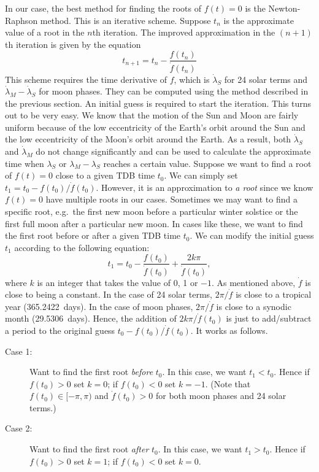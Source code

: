 \documentclass[12pt]{article}
\newcommand \beq {\begin{equation}}
\newcommand \eeq {\end{equation}}
\begin{document}
\begin{CJK}{UTF8}{bkai}
In our case, the best method for finding the roots of $f(t)=0$ is the Newton-Raphson 
method. This is an iterative scheme. Suppose $t_n$ is the approximate value of 
a root in the $n$th iteration. The improved approximation in the $(n+1)$th iteration 
is given by the equation 
\beq
  t_{n+1} = t_n - \frac{f(t_n)}{\dot{f}(t_n)} 
\eeq
This scheme requires the time derivative of $f$, which is $\dot{\lambda}_S$ for 
24 solar terms and $\dot{\lambda}_M - \dot{\lambda}_S$ for moon phases. They can be 
computed using the method described in the previous section. An initial guess is 
required to start the iteration. 
This turns out to be very easy. We know that the motion of the Sun and 
Moon are fairly uniform because of the low eccentricity of the Earth's orbit around 
the Sun and the low eccentricity of the Moon's orbit around the Earth. As a result, 
both $\dot{\lambda}_S$ and $\dot{\lambda}_M$ do not change significantly and can be 
used to calculate the approximate time when $\lambda_S$ or $\lambda_M-\lambda_S$ 
reaches a certain value. Suppose we want to find a root of $f(t)=0$ close to 
a given TDB time $t_0$. We can simply set $t_1 = t_0 - f(t_0)/\dot{f}(t_0)$. 
However, it is an approximation to 
{\em a root} since we know $f(t)=0$ have multiple roots in our cases. Sometimes 
we may want to find a specific root, e.g.\ the first new moon before a particular 
winter solstice or the first full moon after a particular new moon. In cases like 
these, we want to find the first root before or after a given TDB time $t_0$. We can 
modify the initial guess $t_1$ according to the following equation:
\beq
  t_1 = t_0 - \frac{f(t_0)}{\dot{f}(t_0)} + \frac{2k\pi}{\dot{f}(t_0)} ,
\eeq
where $k$ is an integer that takes the value of 0, 1 or $-1$. As mentioned above, 
$\dot{f}$ is close to being a constant. In the case of 24 solar terms, 
$2\pi/\dot{f}$ is close to a tropical year (365.2422~days). In the case of 
moon phases, $2\pi/\dot{f}$ is close to a synodic month (29.5306~days). 
Hence, the addition of $2k\pi/\dot{f}(t_0)$ is just to add/subtract 
a period to the original guess $t_0 - f(t_0)/\dot{f}(t_0)$. It works 
as follows. 

\begin{description}
\item[Case 1:] Want to find the first root {\em before} $t_0$. In this case, we want
$t_1<t_0$. Hence if $f(t_0) >0$ set $k=0$; if $f(t_0) <0$ set $k=-1$. (Note that
$f(t_0) \in [-\pi,\pi)$ and $\dot{f}(t_0) > 0$ for both moon phases and 24 solar terms.)

\item[Case 2:] Want to find the first root {\em after} $t_0$. In this case, we want
$t_1>t_0$. Hence if $f(t_0) >0$ set $k=1$; if $f(t_0) <0$ set $k=0$.
\end{description}


\end{CJK}
\end{document}
